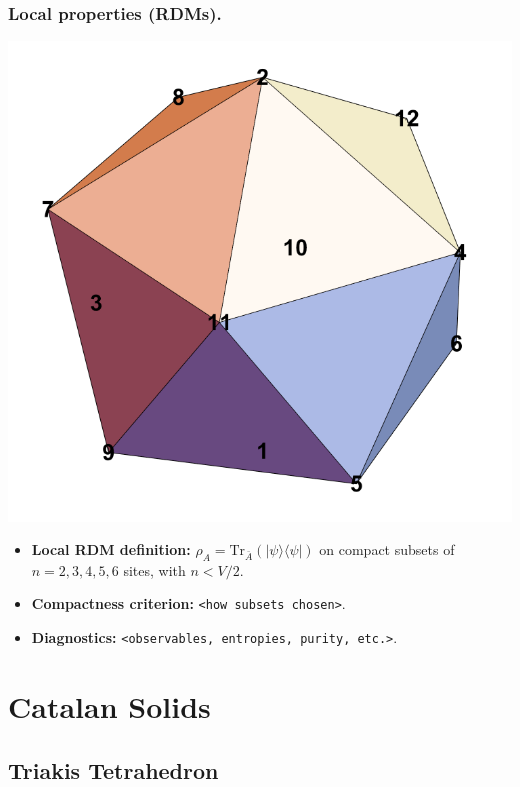 \documentclass[11pt,a4paper]{article}
\begin{document}
\subsubsection*{Local properties (RDMs).}
\begin{center}
  \includegraphics[width=.6\linewidth]{icosahedron}
\end{center}

\begin{itemize}[leftmargin=1.5em]
  \item \textbf{Local RDM definition:} $\rho_A=\mathrm{Tr}_{\bar A}(|\psi\rangle\langle\psi|)$ on compact subsets of $n=2,3,4,5,6$ sites, with $n < V/2$.
  \item \textbf{Compactness criterion:} \texttt{<how subsets chosen>}.
  \item \textbf{Diagnostics:} \texttt{<observables, entropies, purity, etc.>}.
\end{itemize}


\section*{Catalan Solids}

\subsection*{Triakis Tetrahedron}
\end{document}
